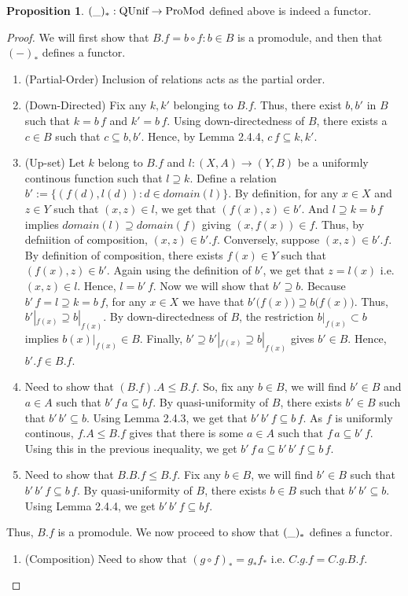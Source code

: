 \documentclass[18pt,a4paper]{article}
\theoremstyle{definition}
\newtheorem{proop}[theorem]{Proposition}
\begin{document}
\begin{proop} $(\string _ )_*:\text{QUnif} \to \text{ProMod}$ defined above is indeed a functor.
\end{proop}
\begin{proof}
	We will first show that $B.f={b \circ f: b \in B}$
	is a promodule, and then that $(-)_*$ defines a functor.
	\begin{enumerate}[label=(\roman*)]
		\item (Partial-Order) Inclusion of relations acts as the partial order.
		\item (Down-Directed) Fix any $k,k'$ belonging to $B.f$. Thus, there exist
			$b,b'$ in $B$ such that $k=b\,f$ and $k'=b\,f$. Using down-directedness
			of $B$, there exists a $c \in B$ such that $c \subseteq b,b'$. Hence,
			by Lemma 2.4.4, $c\,f \subseteq k,k'$.
		\item (Up-set) Let $k$ belong to $B.f$ and $l:(X,A) \to (Y,B)$ be a
			uniformly continous function such that $l \supseteq k$.
			Define a relation $b':= \{(f(d),l(d)): d \in domain(l) \}$.
			By definition, for any $x \in X$ and $z \in Y$ such that $(x,z) \in l$, we get that
			$(f(x),z)\in b'$. And $l \supseteq k=b\, f$ implies $domain(l)  \supseteq domain(f)$
			giving $(x,f(x)) \in f$. Thus, by defniition of composition,
			$(x,z) \in b'.f$. Conversely, suppose $(x,z) \in b'.f$.
			By definition of composition, there exists $f(x)\in Y$ such that
			$(f(x),z) \in b'$. Again using the definition of
			$b'$, we get that $z=l(x)$ i.e. $(x,z)\in l$. Hence, $l=b'\, f$.
			Now we will show that $b'\supseteq b$. Because $b'\, f=l \supseteq k=b\, f$, for any
			$x\in X$ we have that $b'\big(f(x)\big) \supseteq b\big(f(x)\big)$. Thus,
			$b'|_{f(x)} \supseteq b|_{f(x)}$. By down-directedness of $B$,
			the restriction $b|_{f(x)} \subset b$ implies $ b(x)|_{f(x)} \in B$.
			Finally, $b' \supseteq b'|_{f(x)} \supseteq b|_{f(x)}$ gives $b' \in B$.
			Hence, $b'.f \in B.f$.
		\item Need to show that $(B.f).A \leq B.f$. So, fix any $b\in B$, we will find
			$b' \in B$ and $a\in A$ such that $b' \, f\,a \subseteq bf$.
			By quasi-uniformity of $B$, there exists $b' \in B$ such that $b'\,b'
			\subseteq b$. Using Lemma 2.4.3, we get that $b'\,b'\,f \subseteq b\,f$.
			As $f$ is uniformly continous, $f.A \leq B.f$ gives that there is some
			$a \in A \text{ such that } f\,a \subseteq b'\,f$. Using this in the
			previous inequality, we get $b'\,f\,a \subseteq b'\,b'\,f\subseteq  b\,f$.
		\item Need to show that $B.B.f \leq B.f$. Fix any $b \in B$, we will find
			$b' \in B$ such that $b'\,b'\,f \subseteq b\,f$.
			By quasi-uniformity of $B$, there exists $b \in B$ such that
			$b'\,b' \subseteq  b$. Using Lemma 2.4.4, we get $b'\,b'\,f \subseteq bf$.
	\end{enumerate}
	Thus, $B.f$ is a promodule. We now proceed to show that $(\string _)_*$ defines a functor.
	\begin{enumerate}[label=(\roman*)]
		\item (Composition) Need to show that $(g\circ f)_*=g_*f_*$ i.e. $C.g.f=C.g.B.f$.


\end{enumerate}
\end{proof}
\end{document}
